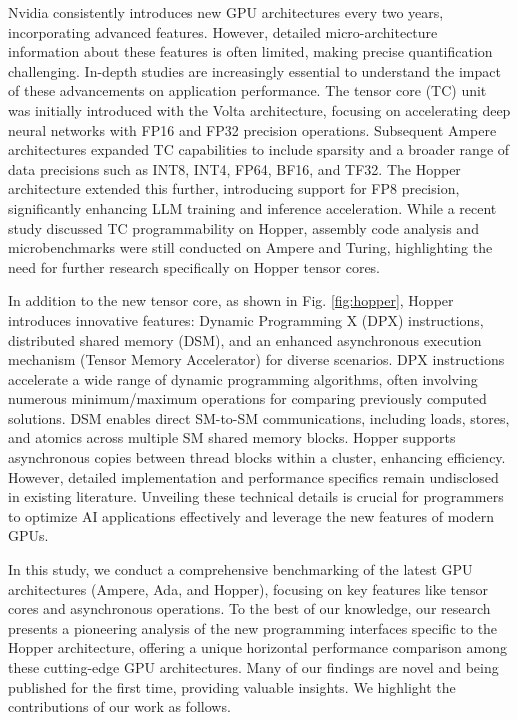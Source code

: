 Nvidia consistently introduces new GPU architectures every two years, incorporating advanced features. However, detailed micro-architecture information about these features is often limited, making precise quantification challenging. In-depth studies are increasingly essential to understand the impact of these advancements on application performance. The tensor core (TC) unit was initially introduced with the Volta architecture, focusing on accelerating deep neural networks with FP16 and FP32 precision operations. Subsequent Ampere architectures expanded TC capabilities to include sparsity and a broader range of data precisions such as INT8, INT4, FP64, BF16, and TF32. The Hopper architecture extended this further, introducing support for FP8 precision, significantly enhancing LLM training and inference acceleration. While a recent study \cite{sun_tpds_2023} discussed TC programmability on Hopper, assembly code analysis and microbenchmarks were still conducted on Ampere and Turing, highlighting the need for further research specifically on Hopper tensor cores.

In addition to the new tensor core, as shown in Fig. \ref{fig:hopper}, Hopper introduces innovative features: Dynamic Programming X (DPX) instructions, distributed shared memory (DSM), and an enhanced asynchronous execution mechanism (Tensor Memory Accelerator) for diverse scenarios. DPX instructions accelerate a wide range of dynamic programming algorithms, often involving numerous minimum/maximum operations for comparing previously computed solutions. DSM enables direct SM-to-SM communications, including loads, stores, and atomics across multiple SM shared memory blocks. Hopper supports asynchronous copies between thread blocks within a cluster, enhancing efficiency. However, detailed implementation and performance specifics remain undisclosed in existing literature. Unveiling these technical details is crucial for programmers to optimize AI applications effectively and leverage the new features of modern GPUs.

In this study, we conduct a comprehensive benchmarking of the latest GPU architectures (Ampere, Ada, and Hopper), focusing on key features like tensor cores and asynchronous operations. To the best of our knowledge, our research presents a pioneering analysis of the new programming interfaces specific to the Hopper architecture, offering a unique horizontal performance comparison among these cutting-edge GPU architectures. Many of our findings are novel and being published for the first time, providing valuable insights. We highlight the contributions of our work as follows.

